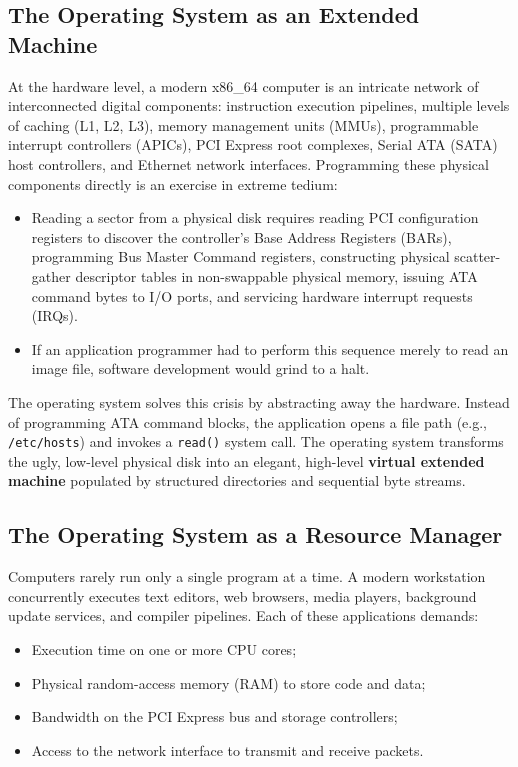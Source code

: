 \subsection{The Operating System as an Extended Machine}
At the hardware level, a modern x86\_64 computer is an intricate network of interconnected digital components: instruction execution pipelines, multiple levels of caching (L1, L2, L3), memory management units (MMUs), programmable interrupt controllers (APICs), PCI Express root complexes, Serial ATA (SATA) host controllers, and Ethernet network interfaces. Programming these physical components directly is an exercise in extreme tedium:
\begin{itemize}
    \item Reading a sector from a physical disk requires reading PCI configuration registers to discover the controller's Base Address Registers (BARs), programming Bus Master Command registers, constructing physical scatter-gather descriptor tables in non-swappable physical memory, issuing ATA command bytes to I/O ports, and servicing hardware interrupt requests (IRQs).
    \item If an application programmer had to perform this sequence merely to read an image file, software development would grind to a halt.
\end{itemize}

The operating system solves this crisis by abstracting away the hardware. Instead of programming ATA command blocks, the application opens a file path (e.g., \texttt{/etc/hosts}) and invokes a \texttt{read()} system call. The operating system transforms the ugly, low-level physical disk into an elegant, high-level \textbf{virtual extended machine} populated by structured directories and sequential byte streams.

\subsection{The Operating System as a Resource Manager}
Computers rarely run only a single program at a time. A modern workstation concurrently executes text editors, web browsers, media players, background update services, and compiler pipelines. Each of these applications demands:
\begin{itemize}
    \item Execution time on one or more CPU cores;
    \item Physical random-access memory (RAM) to store code and data;
    \item Bandwidth on the PCI Express bus and storage controllers;
    \item Access to the network interface to transmit and receive packets.
\end{itemize}

